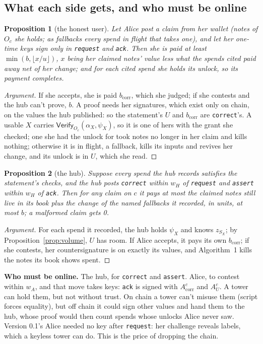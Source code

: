 \documentclass[11pt]{article}
\theoremstyle{plain}
\newtheorem{proposition}{Proposition}
\theoremstyle{definition}
\newcommand{\bcorr}{b_{\mathrm{corr}}}
\newcommand{\tx}[1]{\texttt{#1}}
\newcommand{\Vfy}{\mathsf{Verify}}
\newcommand{\Oc}{O_c}
\newcommand{\Acorr}{A_{\mathrm{corr}}^{c}}
\newcommand{\AU}{A_{U}^{c}}
\begin{document}
\subsection{What each side gets, and who must be online}\label{sec:who}

\begin{proposition}[the honest user]\label{prop:user}
Let Alice post a claim from her wallet (notes of $\Oc$ she holds; as
fallbacks every spend in flight that takes one), and let her one-time
keys sign only in \tx{request} and \tx{ack}. Then she is paid at least
$\min(b, \lfloor x/u \rfloor)$, $x$ being her claimed notes' value less
what the spends cited paid away net of her change; and for each cited
spend she holds its unlock, so its payment completes.
\end{proposition}
\begin{proof}[Argument]
If she accepts, she is paid $\bcorr$, which she judged; if she contests
and the hub can't prove, $b$. A proof needs her signatures, which exist
only on chain, on the values the hub published: so the statement's $U$
and $\bcorr$ are \tx{correct}'s. A usable $X$ carries $\Vfy_{\Oc}(\alpha_X,
\psi_X)$, so it is one of hers with the grant she checked; one she had
the unlock for took notes no longer in her claim and kills nothing;
otherwise it is in flight, a fallback, kills its inputs and revives her
change, and its unlock is in $U$, which she read.
\end{proof}

\begin{proposition}[the hub]\label{prop:hub}
Suppose every spend the hub records satisfies the statement's checks,
and the hub posts \tx{correct} within $w_H$ of \tx{request} and
\tx{assert} within $w_H$ of \tx{ack}. Then for any claim on $c$ it pays
at most the claimed notes still live in its book plus the change of the
named fallbacks it recorded, in units, at most $b$; a malformed claim
gets 0.
\end{proposition}
\begin{proof}[Argument]
For each spend it recorded, the hub holds $\psi_X$ and knows $z_{S_X}$;
by Proposition~\ref{prop:volume}, $U$ has room. If Alice accepts, it
pays its own $\bcorr$; if she contests, her countersignature is on
exactly its values, and Algorithm~1 kills the notes its book shows spent.
\end{proof}

\textbf{Who must be online.} The hub, for \tx{correct} and \tx{assert}.
Alice, to contest within $w_A$, and that move takes keys: \tx{ack} is
signed with $\Acorr$ and $\AU$. A tower can hold them, but not without
trust. On chain a tower can't misuse them (script forces equality), but
off chain it could sign other values and hand them to the hub, whose
proof would then count spends whose unlocks Alice never saw. Version
0.1's Alice needed no key after \tx{request}: her challenge reveals
labels, which a keyless tower can do. This is the price of dropping the
chain.
\end{document}

